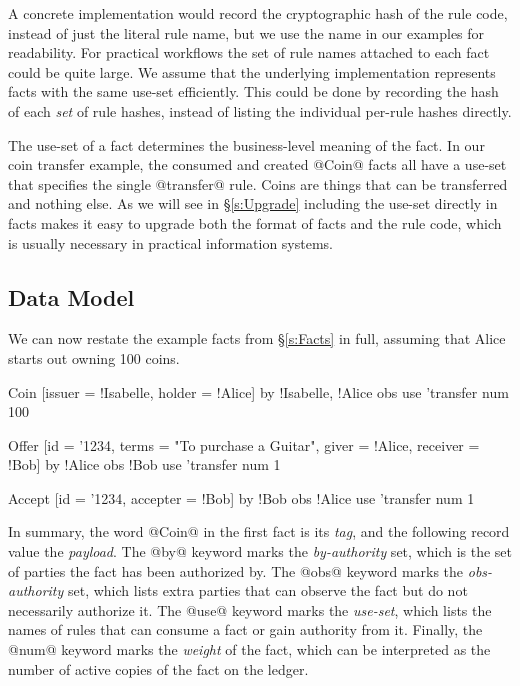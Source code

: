 A concrete implementation would record the cryptographic hash of the rule code, instead of just the literal rule name, but we use the name in our examples for readability. For practical workflows the set of rule names attached to each fact could be quite large. We assume that the underlying implementation represents facts with the same use-set efficiently. This could be done by recording the hash of each \emph{set} of rule hashes, instead of listing the individual per-rule hashes directly.

\eject{}
The use-set of a fact determines the business-level meaning of the fact. In our coin transfer example, the consumed and created @Coin@ facts all have a use-set that specifies the single @transfer@ rule. Coins are things that can be transferred and nothing else. As we will see in \S\ref{s:Upgrade} including the use-set directly in facts makes it easy to upgrade both the format of facts and the rule code, which is usually necessary in practical information systems.


\subsection{Data Model}
\label{s:NowWithMetadata}
\label{s:DataModel}
We can now restate the example facts from \S\ref{s:Facts} in full, assuming that Alice starts out owning 100 coins.
\begin{small}
\begin{code}
 Coin   [issuer = !Isabelle, holder  = !Alice]
    by  {!Isabelle, !Alice}  obs {}
    use {'transfer}          num 100

 Offer  [id = '1234, terms = "To purchase a Guitar",
         giver = !Alice, receiver = !Bob]
    by  {!Alice}             obs {!Bob}
    use {'transfer}          num 1

 Accept [id = '1234, accepter = !Bob]
    by  {!Bob}               obs {!Alice}
    use {'transfer}          num 1
\end{code}
\end{small}
In summary, the word @Coin@ in the first fact is its \emph{tag}, and the following record value the \emph{payload}. The @by@ keyword marks the \emph{by-authority} set, which is the set of parties the fact has been authorized by. The @obs@ keyword marks the \emph{obs-authority} set, which lists extra parties that can observe the fact but do not necessarily authorize it. The @use@ keyword marks the \emph{use-set}, which lists the names of rules that can consume a fact or gain authority from it. Finally, the @num@ keyword marks the \emph{weight} of the fact, which can be interpreted as the number of active copies of the fact on the ledger.

